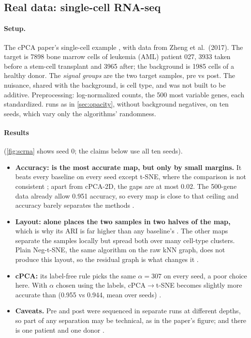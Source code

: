 \clearpage
\subsection{Real data: single-cell RNA-seq}
\label{sec:scrna}

\paragraph{Setup.} The cPCA paper's single-cell example \cite{abid2018cpca}, with data from Zheng et al.\ (2017). The target is 7898 bone marrow cells of leukemia (AML) patient 027, 3933 taken before a stem-cell transplant and 3965 after; the background is 1985 cells of a healthy donor. The \emph{signal groups} are the two target samples, pre vs post. The nuisance, shared with the background, is cell type, and was not built to be additive. Preprocessing: log-normalized counts, the 500 most variable genes, each standardized. \methodname{} runs as in \cref{sec:opacity}, without background negatives, on ten seeds, which vary only the algorithms' randomness.

\paragraph{Results} (\cref{fig:scrna} shows seed 0; the claims below use all ten seeds).
\begin{itemize}
  \item \textbf{Accuracy: \methodname{} is the most accurate map, but only by small margins.} It beats every baseline on every seed except t-SNE, where the comparison is not consistent \cpre; apart from cPCA-2D, the gaps are at most 0.02. The 500-gene data already allow 0.951 accuracy, so every map is close to that ceiling and accuracy barely separates the methods \cdesc.
  \item \textbf{Layout: \methodname{} alone places the two samples in two halves of the map,} which is why its ARI is far higher than any baseline's \cdesc. The other maps separate the samples locally but spread both over many cell-type clusters. Plain Neg-t-SNE, the same algorithm on the raw kNN graph, does not produce this layout, so the residual graph is what changes it \cdesc.
  \item \textbf{cPCA:} its label-free rule picks the same $\alpha = 307$ on every seed, a poor choice here. With $\alpha$ chosen using the labels, cPCA$\to$t-SNE becomes slightly more accurate than \methodname{} (0.955 vs 0.944, mean over seeds) \cdesc.
  \item \textbf{Caveats.} Pre and post were sequenced in separate runs at different depths, so part of any separation may be technical, as in the paper's figure; and there is one patient and one donor \cinterp.
\end{itemize}

